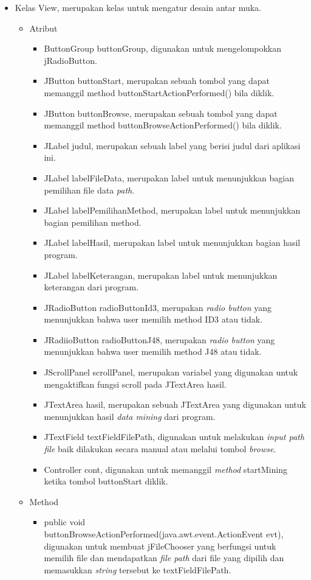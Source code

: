\begin{itemize}
	
	\item Kelas View, merupakan kelas untuk mengatur desain antar muka.
	\begin{itemize}
		\item Atribut
		\begin{itemize}
			\item ButtonGroup buttonGroup, digunakan untuk mengelompokkan jRadioButton.
			\item JButton buttonStart, merupakan sebuah tombol yang dapat memanggil method buttonStartActionPerformed() bila diklik.
			\item JButton buttonBrowse, merupakan sebuah tombol yang dapat memanggil method buttonBrowseActionPerformed() bila diklik.
			\item JLabel judul, merupakan sebuah label yang berisi judul dari aplikasi ini.
			\item JLabel labelFileData, merupakan label untuk menunjukkan bagian pemilihan file data \textsl{path}.
			\item JLabel labelPemilihanMethod, merupakan label untuk menunjukkan bagian pemilihan method.
			\item JLabel labelHasil, merupakan label untuk menunjukkan bagian hasil program.
			\item JLabel labelKeterangan, merupakan label untuk menunjukkan keterangan dari program.
			\item JRadioButton radioButtonId3, merupakan \textsl{radio button} yang menunjukkan bahwa user memilih method ID3 atau tidak.
			\item JRadiioButton radioButtonJ48, merupakan \textsl{radio button} yang menunjukkan bahwa user memilih method J48 atau tidak.
			\item JScrollPanel scrollPanel, merupakan variabel yang digunakan untuk mengaktifkan fungsi scroll pada JTextArea hasil.
			\item JTextArea hasil, merupakan sebuah JTextArea yang digunakan untuk menunjukkan hasil \textsl{data mining} dari program.
			\item JTextField textFieldFilePath, digunakan untuk melakukan \textsl{input path file }baik dilakukan secara manual atau melalui tombol \textsl{browse}.
			\item Controller cont, digunakan untuk memanggil \textsl{method} startMining ketika tombol buttonStart diklik.
		\end{itemize}
		\item Method
		\begin{itemize}
			\item public void buttonBrowseActionPerformed(java.awt.event.ActionEvent evt), digunakan untuk membuat jFileChooser yang berfungsi untuk memilih file dan mendapatkan \textsl{file path} dari file yang dipilih dan memasukkan \textsl{string }tersebut ke textFieldFilePath.

\end{itemize}
\end{itemize}
\end{itemize}
